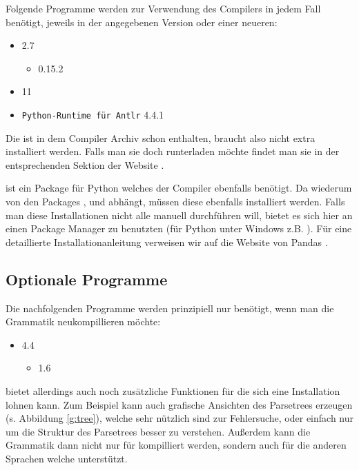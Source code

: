 Folgende Programme werden zur Verwendung des Compilers in jedem Fall benötigt, jeweils in der angegebenen Version oder einer neueren:

\begin{itemize}
\item {} 2.7
\begin{itemize}
\item {} 0.15.2
\end{itemize}

\item {} 11
\item \texttt{Python-Runtime für Antlr} 4.4.1
\end{itemize}

Die  ist in dem Compiler Archiv schon enthalten, braucht also nicht extra installiert werden. Falls man sie doch runterladen möchte findet man sie in der entsprechenden Sektion der  Website \cite{pyruntime}.

 ist ein Package für Python welches der Compiler ebenfalls benötigt. Da  wiederum von den Packages ,  und  abhängt, müssen diese ebenfalls installiert werden. Falls man diese Installationen nicht alle manuell durchführen will, bietet es sich hier an einen Package Manager zu benutzten (für Python unter Windows z.B. ). Für eine detaillierte Installationanleitung verweisen wir auf die Website von Pandas  \cite{pandas}.

\subsection{Optionale Programme}

Die nachfolgenden Programme werden prinzipiell nur benötigt, wenn man die Grammatik  neukompillieren möchte:
\begin{itemize}
\item {} 4.4

\begin{itemize}
\item {} 1.6
\end{itemize}
\end{itemize}

 bietet allerdings auch noch zusätzliche Funktionen für die sich eine Installation lohnen kann. Zum Beispiel kann  auch grafische Ansichten des Parsetrees erzeugen (s. Abbildung \ref{g:tree}), welche sehr nützlich sind zur Fehlersuche, oder einfach nur um die Struktur des Parsetrees besser zu verstehen. Außerdem kann die Grammatik dann nicht nur für  kompilliert werden, sondern auch für die anderen Sprachen welche   unterstützt.


